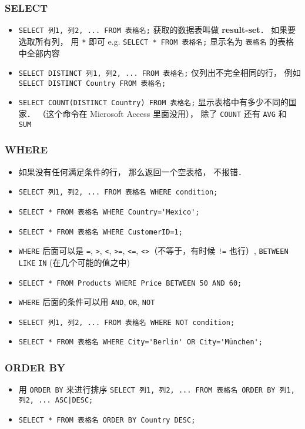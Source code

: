 \subsubsection{SELECT}
\begin{itemize}
\item \verb`SELECT 列1, 列2, ... FROM 表格名;` 获取的数据表叫做 \textbf{result-set}． 如果要选取所有列， 用 \verb`*` 即可 e.g. \verb`SELECT * FROM 表格名;` 显示名为 \verb|表格名| 的表格中全部内容
\item \verb`SELECT DISTINCT 列1, 列2, ... FROM 表格名;` 仅列出不完全相同的行， 例如 \verb`SELECT DISTINCT Country FROM 表格名;`
\item \verb`SELECT COUNT(DISTINCT Country) FROM 表格名;` 显示表格中有多少不同的国家． （这个命令在 Microsoft Access 里面没用）， 除了 \verb|COUNT| 还有 \verb|AVG| 和 \verb|SUM|
\end{itemize}

\subsubsection{WHERE}
\begin{itemize}
\item 如果没有任何满足条件的行， 那么返回一个空表格， 不报错．
\item \verb`SELECT 列1, 列2, ... FROM 表格名 WHERE condition;`
\item \verb`SELECT * FROM 表格名 WHERE Country='Mexico';`
\item \verb`SELECT * FROM 表格名 WHERE CustomerID=1;`
\item \verb`WHERE` 后面可以是 \verb`=`, \verb`>`, \verb`<`, \verb`>=`, \verb`<=`, \verb`<>`（不等于，有时候 \verb`!=` 也行）, \verb`BETWEEN` \verb`LIKE` \verb`IN` (在几个可能的值之中)
\item \verb`SELECT * FROM Products WHERE Price BETWEEN 50 AND 60;`
\item \verb`WHERE` 后面的条件可以用 \verb`AND`, \verb`OR`, \verb`NOT`
\item \verb`SELECT 列1, 列2, ... FROM 表格名 WHERE NOT condition;`
\item \verb`SELECT * FROM 表格名 WHERE City='Berlin' OR City='München';`
\end{itemize}

\subsubsection{ORDER BY}
\begin{itemize}
\item 用 \verb`ORDER BY` 来进行排序 \verb`SELECT 列1, 列2, ... FROM 表格名 ORDER BY 列1, 列2, ... ASC|DESC;`
\item \verb`SELECT * FROM 表格名 ORDER BY Country DESC;`
\end{itemize}

